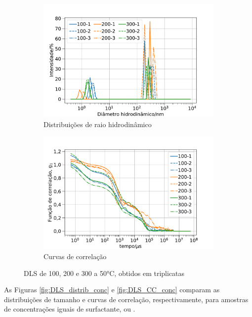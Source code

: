 \begin{figure}[h]
	\begin{subfigure}{0.50\textwidth}
		\centering
		\includegraphics[width=\textwidth]{imagens/dls/ttab_distrib}
		\caption{Distribuições de raio hidrodinâmico}
		\label{fig:DLS_ttab_distrib}
	\end{subfigure} %
	\begin{subfigure}{0.50\textwidth}
		\centering
		\includegraphics[width=\textwidth]{imagens/dls/ttab_CC}
		\caption{Curvas de correlação}
		\label{fig:DLS_ttab_cc}
	\end{subfigure}
	\caption{DLS de \TTAB{} 100, 200 e 300 \mM{} a 50°C, obtidos em triplicatas}
	\label{fig:DLS_ttab}
\end{figure}

	As Figuras \ref{fig:DLS_distrib_conc} e \ref{fig:DLS_CC_conc} comparam as distribuições de tamanho e curvas de correlação, respectivamente, para amostras de concentrações iguais de surfactante, \CTAB{} ou \TTAB.

